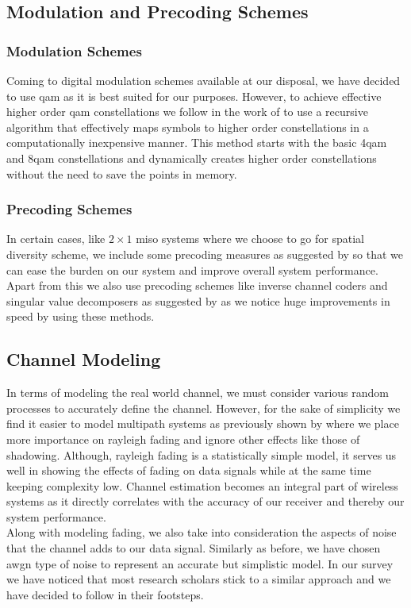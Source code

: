 \subsection{Modulation and Precoding Schemes}

\subsubsection{Modulation Schemes}
Coming to digital modulation schemes available at our disposal, we have decided to use \acrshort{qam} as it is best suited for our purposes. However, to achieve effective higher order \acrshort{qam} constellations we follow in the work of \textcite{Bellili2015} to use a recursive algorithm that effectively maps symbols to higher order constellations in a computationally inexpensive manner. This method starts with the basic 4\acrshort{qam} and 8\acrshort{qam} constellations and dynamically creates higher order constellations without the need to save the points in memory.

\subsubsection{Precoding Schemes}
In certain cases, like $2 \times 1$ \acrshort{miso} systems where we choose to go for \gls{spatial diversity} scheme, we include some precoding measures as suggested by \textcite{Alamouti1998} so that we can ease the burden on our system and improve overall system performance. Apart from this we also use precoding schemes like inverse channel coders and singular value decomposers as suggested by \textcite{Klema1980} as we notice huge improvements in speed by using these methods.

\subsection{Channel Modeling}
In terms of modeling the real world channel, we must consider various random processes to accurately define the channel. However, for the sake of simplicity we find it easier to model multipath systems as previously shown by \textcite{Hanlen2006} where we place more importance on \gls{rayleigh fading} and ignore other effects like those of shadowing. Although, \gls{rayleigh fading} is a statistically simple model, it serves us well in showing the effects of fading on data signals while at the same time keeping complexity low. Channel estimation becomes an integral part of wireless systems as it directly correlates with the accuracy of our receiver and thereby our system performance.\\
Along with modeling fading, we also take into consideration the aspects of noise that the channel adds to our data signal. Similarly as before, we have chosen \acrshort{awgn} type of noise to represent an accurate but simplistic model. In our survey we have noticed that most research scholars stick to a similar approach and we have decided to follow in their footsteps.


